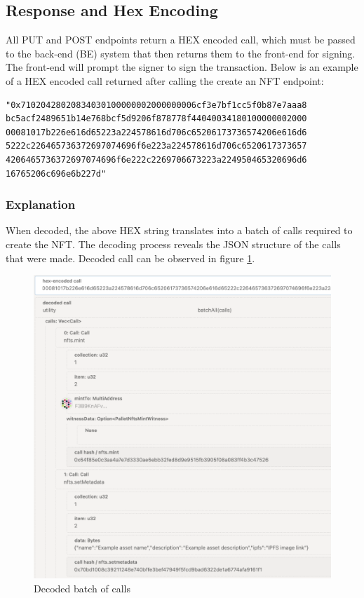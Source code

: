 \subsection{Response and Hex Encoding}
All PUT and POST endpoints return a HEX encoded call, which must be passed to the back-end (BE) system that then returns them to the front-end for signing. The front-end will prompt the signer to sign the transaction. Below is an example of a HEX encoded call returned after calling the create an NFT endpoint:

\begin{lstlisting}
"0x71020428020834030100000002000000006cf3e7bf1cc5f0b87e7aaa8
bc5acf2489651b14e768bcf5d9206f878778f44040034180100000002000
00081017b226e616d65223a224578616d706c65206173736574206e616d6
5222c226465736372697074696f6e223a224578616d706c6520617373657
4206465736372697074696f6e222c2269706673223a224950465320696d6
16765206c696e6b227d"
\end{lstlisting}

\subsubsection{Explanation}
When decoded, the above HEX string translates into a batch of calls required to create the NFT. The decoding process reveals the JSON structure of the calls that were made. Decoded call can be observed in figure \ref{hex}.

\begin{figure}[h!]
    \centering
    \includegraphics[width=\textwidth]{figs/nft-decoded-extrinsic.png}
    \caption{Decoded batch of calls}
    \label{hex}
\end{figure}

